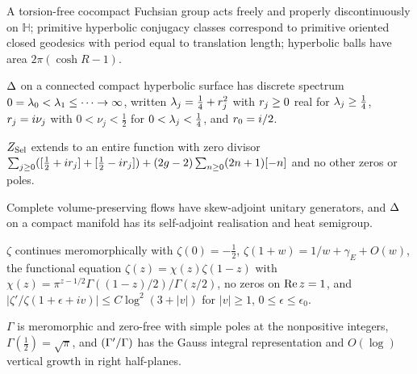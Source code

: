 \begin{assumption}
\label{asm:fuchsian-geometry}
A torsion-free cocompact Fuchsian group acts freely and properly
discontinuously on $\mathbb H$; primitive hyperbolic conjugacy classes
correspond to primitive oriented closed geodesics with period equal to
translation length; hyperbolic balls have area $2\pi(\cosh R-1)$.
\end{assumption}

\begin{assumption}
\label{asm:laplace-spectrum-compact}
$\Delta$ on a connected compact hyperbolic surface has discrete spectrum
$0 = \lambda_{0} < \lambda_{1}\le\cdots\to\infty$, written $\lambda_{j} = \frac14 +
r_{j}^2$ with $r_{j}\ge0$ real for $\lambda_{j}\ge\frac14$, $r_{j} = i\nu_j$
with $0<\nu_j<\frac12$ for $0<\lambda_{j}<\frac14$, and $r_{0} = i/2$.
\end{assumption}

\begin{assumption}
\label{asm:selberg-zeta-entire}
$Z_{\mathrm{Sel}}$ extends to an entire function with zero divisor
$\sum_{j\ge0}([\tfrac12+ir_{j}]+[\tfrac12-ir_{j}]) +
(2g-2)\sum_{n\ge0}(2n+1)[-n]$ and no other zeros or poles.
\end{assumption}

\begin{assumption}
\label{asm:heat-semigroup}
Complete volume-preserving flows have skew-adjoint unitary generators, and
$\Delta$ on a compact manifold has its self-adjoint realisation and heat
semigroup.
\end{assumption}

\begin{assumption}
\label{asm:zeta-standard}
$\zeta$ continues meromorphically with $\zeta(0) = -\tfrac12$,
$\zeta(1+w) = 1/w + \gamma_E + O(w)$, the functional equation
$\zeta(z) = \chi(z)\zeta(1-z)$ with $\chi(z) = \pi^{z-1/2}\Gamma((1-z)/2)/\Gamma(z/2)$,
no zeros on $\operatorname{Re} z = 1$, and $|\zeta'/\zeta(1+\epsilon+iv)|\le C\log^2(3+|v|)$
for $|v|\ge1$, $0\le\epsilon\le\epsilon_0$.
\end{assumption}

\begin{assumption}
\label{asm:gamma-standard}
$\Gamma$ is meromorphic and zero-free with simple poles at the nonpositive
integers, $\Gamma(\tfrac12) = \sqrt\pi$, and $(\Gamma'/\Gamma)$ has the Gauss integral
representation and $O(\log)$ vertical growth in right half-planes.
\end{assumption}

